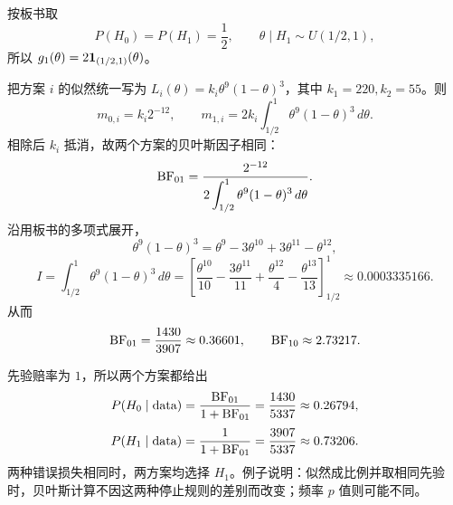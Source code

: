 按板书取
\[
P(H_0)=P(H_1)=\frac12,\qquad
\theta\mid H_1\sim U(1/2,1),
\]
所以 $g_1(\theta)=2\mathbf{1}_{(1/2,1)}(\theta)$。

把方案 $i$ 的似然统一写为 $L_i(\theta)=k_i\theta^9(1-\theta)^3$，其中 $k_1=220,k_2=55$。则
\[
m_{0,i}=k_i2^{-12},\qquad
m_{1,i}=2k_i\int_{1/2}^1\theta^9(1-\theta)^3\,d\theta.
\]
相除后 $k_i$ 抵消，故两个方案的贝叶斯因子相同：
\[
\operatorname{BF}_{01}=\frac{2^{-12}}{2\displaystyle\int_{1/2}^1\theta^9(1-\theta)^3\,d\theta}.
\]
沿用板书的多项式展开，
\[
\theta^9(1-\theta)^3=\theta^9-3\theta^{10}+3\theta^{11}-\theta^{12},
\]
\[
I=\int_{1/2}^1\theta^9(1-\theta)^3\,d\theta
=\left[\frac{\theta^{10}}{10}-\frac{3\theta^{11}}{11}
+\frac{\theta^{12}}4-\frac{\theta^{13}}{13}\right]_{1/2}^1
\approx0.0003335166.
\]
从而
\[
\operatorname{BF}_{01}=\frac{1430}{3907}\approx0.36601,\qquad
\operatorname{BF}_{10}\approx2.73217.
\]

先验赔率为 $1$，所以两个方案都给出
\[
P(H_0\mid\text{data})=\frac{\operatorname{BF}_{01}}{1+\operatorname{BF}_{01}}
=\frac{1430}{5337}\approx0.26794,
\]
\[
P(H_1\mid\text{data})=\frac1{1+\operatorname{BF}_{01}}
=\frac{3907}{5337}\approx0.73206.
\]
两种错误损失相同时，两方案均选择 $H_1$。例子说明：似然成比例并取相同先验时，贝叶斯计算不因这两种停止规则的差别而改变；频率 $p$ 值则可能不同。

